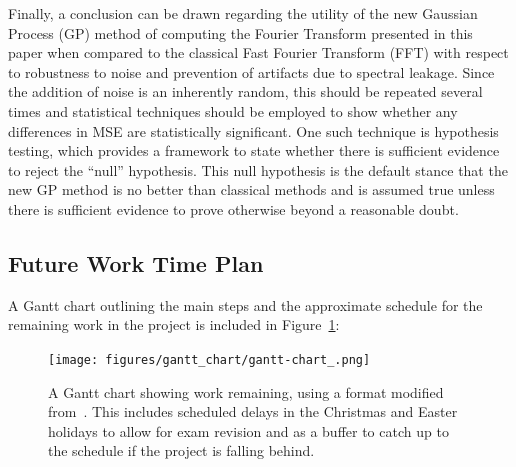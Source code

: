 \documentclass[12pt]{article}
\begin{document}
    Finally, a conclusion can be drawn regarding the utility of the new Gaussian Process (GP) method of computing the Fourier Transform presented in this paper when compared to the classical Fast Fourier Transform (FFT) with respect to robustness to noise and prevention of artifacts due to spectral leakage.
    Since the addition of noise is an inherently random, this should be repeated several times and statistical techniques should be employed to show whether any differences in MSE are statistically significant.
    One such technique is hypothesis testing, which provides a framework to state whether there is sufficient evidence to reject the ``null'' hypothesis.
    This null hypothesis is the default stance that the new GP method is no better than classical methods and is assumed true unless there is sufficient evidence to prove otherwise beyond a reasonable doubt.

    \subsection{Future Work Time Plan}
    A Gantt chart outlining the main steps and the approximate schedule for the remaining work in the project is included in Figure~\ref{fig:gantt-chart_}:

    \begin{landscape}
        \begin{figure}[p] %
            \centering
            \texttt{[image: figures/gantt\_chart/gantt-chart\_.png]}
            \caption{A Gantt chart showing work remaining, using a format modified from~\cite{DataCampGanttChart2021}. This includes scheduled delays in the Christmas and Easter holidays to allow for exam revision and as a buffer to catch up to the schedule if the project is falling behind.}
            \label{fig:gantt-chart_}
        \end{figure}
    \end{landscape}

%    

    \printbibliography
\end{document}
